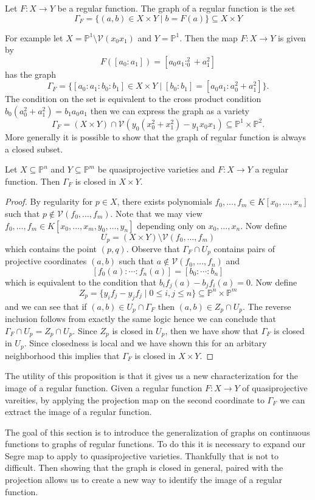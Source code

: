\documentclass[40pt]{article}
\newcommand{\Proj}{\mathbb{P}}
\newcommand{\V}{\mathcal{V}}
\theoremstyle{remark}
\begin{document}
			\begin{newdef}
				Let $F: X \to Y$ be a regular function. The graph of a regular function is the set 
				\[
				\Gamma_F =\{(a,b) \in X \times Y \; | \; b = F(a) \}\subseteq X \times Y
				\]
			\end{newdef}
			For example let $X = \Proj^1 \setminus \V(x_0x_1)$ and $Y = \Proj^1$. Then the map $F : X \to Y$ is given by 
			\[
			F([a_0:a_1]) = [a_0a_1 : _0^2 + a_1^2]
			\]
			has the graph 
			\[
			\Gamma_F = \{[a_0:a_1:b_0:b_1] \in X \times Y \; | \; [b_0:b_1] = [a_0a_1 : a_0^2 + a_1^2 ]\}.
			\]
			The condition on the set is equivalent to the cross product condition $b_0(a_0^2 + a_1^2) = b_1a_0a_1$ then we can express the graph as a variety
			\[
			\Gamma_F = (X \times Y ) \cap \V(y_0(x_0^2 + x_1^2) - y_1x_0x_1) \subseteq \Proj^1 \times \Proj^2.
			\]
			More generally it is possible to show that the graph of  regular function is always a closed subset.
			\begin{prop}
				Let $X \subseteq \Proj^n$ and $Y \subseteq \Proj^m$ be quasiprojective varieties and $F : X\to Y$ a regular function. Then $\Gamma_F$ is closed in $X \times Y$. 
			\end{prop}
			\begin{proof}
				By regularity for $p \in X$, there exists polynomials $f_0,\dots,f_m \in K[x_0,\dots,x_n]$ such that $ p \not \in \V(f_0,\dots,f_m)$. Note that we may view $f_0,\dots,f_m \in K[x_0,\dots,x_m,y_0,\dots,y_n]$ depending only on $x_0,\dots,x_n$. Now define 
				\[
				U_p = (X \times Y) \setminus \V(f_0,\dots,f_m)
				\]
				which contains the point $(p,q)$. Observe that $\Gamma_F\cap U_p$ contains pairs of projective coordinates $(a,b)$ such that $a \not \in \V(f_0,\dots,f_n)$ and 
				\[
				[f_0(a):\cdots:f_n(a)] = [b_0:\cdots:b_n]
				\]
				which is equivalent to the condition that $b_if_j(a) - b_jf_i(a) = 0$. Now define 
				\[
				Z_p = \{y_if_j - y_jf_j \; | \; 0 \leq i, j \leq n\} \subseteq \Proj^n \times \Proj^m
				\]
				and we can see that if $(a,b) \in U_p \cap \Gamma_F$ then $(a,b) \in Z_p \cap U_p$. The reverse inclusion follows from exactly the same logic hence we can conclude that $\Gamma_F \cap U_p = Z_p \cap U_p$. Since $Z_p$ is closed in $U_p$, then we have show that $\Gamma_F$ is closed in $U_p$. Since closedness is local and we have shown this for an arbitary neighborhood this implies that $\Gamma_F$ is closed in $X \times Y$. 
			\end{proof}
			The utility of this proposition is that it gives us a new characterization for the image of a regular function. Given a regular function $F : X \to Y$ of quasiprojective vareities, by applying the projection map on the second coordinate to $\Gamma_F$ we can extract the image of a regular function. 
			\begin{summary}
				The goal of this section is to introduce the generalization of graphs on continuous functions to graphs of regular functions. To do this it is necessary to expand our Segre map to apply to quasiprojective varieties. Thankfully that is not to difficult. Then showing that the graph is closed in general, paired with the projection allows us to create a new way to identify the image of a regular function. 
			\end{summary}
\end{document}

